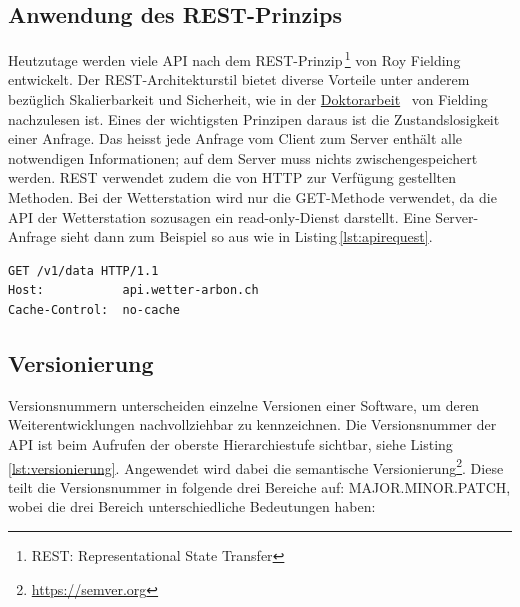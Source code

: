 
\subsection{Anwendung des REST-Prinzips}
Heutzutage werden viele API nach dem REST-Prinzip\,\footnote{REST: Representational State Transfer} von Roy Fielding entwickelt. Der REST-Architekturstil bietet diverse Vorteile unter anderem bezüglich Skalierbarkeit und Sicherheit, wie in der \href{https://www.ics.uci.edu/~fielding/pubs/dissertation/top.htm}{Doktorarbeit}~\cite{Fielding:2000:ASD:932295} von Fielding nachzulesen ist. Eines der wichtigsten Prinzipen daraus ist die Zustandslosigkeit einer Anfrage. Das heisst jede Anfrage vom Client zum Server enthält alle notwendigen Informationen; auf dem Server muss nichts zwischengespeichert werden. REST verwendet zudem die von HTTP zur Verfügung gestellten Methoden\cite{LornaJaneMitchell2013oreilly}. Bei der Wetterstation wird nur die GET-Methode verwendet, da die API der Wetterstation sozusagen ein read-only-Dienst darstellt. Eine Server-Anfrage sieht dann zum Beispiel so aus wie in Listing\,\ref{lst:apirequest}.

\vspace{3mm}
\begin{lstlisting}[label=lst:apirequest,caption=Serveranfrage, language=HTML5, style=php]
GET /v1/data HTTP/1.1
Host:           api.wetter-arbon.ch
Cache-Control:  no-cache
\end{lstlisting}
\vspace{3mm}

\subsection{Versionierung}
Versionsnummern unterscheiden einzelne Versionen einer Software, um deren Weiterentwicklungen nachvollziehbar zu kennzeichnen. Die Versionsnummer der API ist beim Aufrufen der oberste Hierarchiestufe sichtbar, siehe Listing\,\ref{lst:versionierung}. Angewendet wird dabei die semantische Versionierung\footnote{\url{https://semver.org}}. Diese teilt die Versionsnummer in folgende drei Bereiche auf: MAJOR.MINOR.PATCH, wobei die drei Bereich unterschiedliche Bedeutungen haben:


